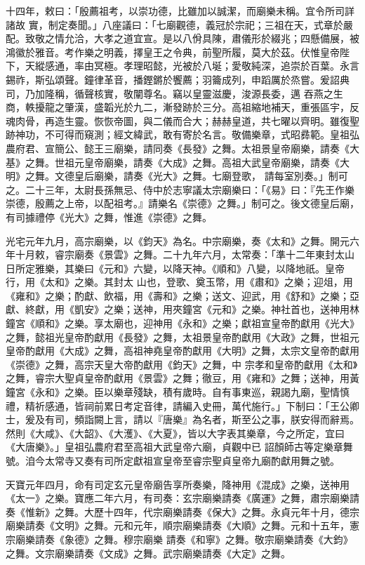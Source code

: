 \begin{pinyinscope}
 十四年，敕曰：「殷薦祖考，以崇功德，比雖加以誠潔，而廟樂未稱。宜令所司詳諸故
 實，制定奏聞。」八座議曰：「七廟觀德，義冠於宗祀；三祖在天，式章於嚴配。致敬之情允洽，大孝之道宜宣。是以八佾具陳，肅儀形於綴兆；四懸備展，被鴻徽於雅音。考作樂之明義，擇皇王之令典，前聖所履，莫大於茲。伏惟皇帝陛下，天縱感通，率由冥極。孝理昭懿，光被於八埏；愛敬純深，追崇於百葉。永言錫祚，斯弘頌聲。鐘律革音，播鏗鏘於饗薦；羽籥成列，申蹈厲於烝嘗。爰詔典司，乃加隆稱，循聲核實，敬闡尊名。竊以皇靈滋慶，浚源長委，邁
 吞燕之生商，軼擾龍之肇漢，盛韜光於九二，漸發跡於三分。高祖縮地補天，重張區宇，反魂肉骨，再造生靈。恢恢帝圖，與二儀而合大；赫赫皇道，共七曜以齊明。雖復聖跡神功，不可得而窺測；經文緯武，敢有寄於名言。敬備樂章，式昭彞範。皇祖弘農府君、宣簡公、懿王三廟樂，請同奏《長發》之舞。太祖景皇帝廟樂，請奏《大基》之舞。世祖元皇帝廟樂，請奏《大成》之舞。高祖大武皇帝廟樂，請奏《大明》之舞。文德皇后廟樂，請奏《光大》之舞。七廟登歌，
 請每室別奏。」制可之。二十三年，太尉長孫無忌、侍中於志寧議太宗廟樂曰：「《易》曰：『先王作樂崇德，殷薦之上帝，以配祖考。』請樂名《崇德》之舞。」制可之。後文德皇后廟，有司據禮停《光大》之舞，惟進《崇德》之舞。



 光宅元年九月，高宗廟樂，以《鈞天》為名。中宗廟樂，奏《太和》之舞。開元六年十月敕，睿宗廟奏《景雲》之舞。二十九年六月，太常奏：「準十二年東封太山日所定雅樂，其樂曰《元和》六變，以降天神。《順和》八變，以降地祇。皇帝行，用《太和》之樂。其封太
 山也，登歌、奠玉幣，用《肅和》之樂；迎俎，用《雍和》之樂；酌獻、飲福，用《壽和》之樂；送文、迎武，用《舒和》之樂；亞獻、終獻，用《凱安》之樂；送神，用夾鐘宮《元和》之樂。神社首也，送神用林鐘宮《順和》之樂。享太廟也，迎神用《永和》之樂；獻祖宣皇帝酌獻用《光大》之舞，懿祖光皇帝酌獻用《長發》之舞，太祖景皇帝酌獻用《大政》之舞，世祖元皇帝酌獻用《大成》之舞，高祖神堯皇帝酌獻用《大明》之舞，太宗文皇帝酌獻用《崇德》之舞，高宗天皇大帝酌獻用《鈞天》之舞，中
 宗孝和皇帝酌獻用《太和》之舞，睿宗大聖貞皇帝酌獻用《景雲》之舞；徹豆，用《雍和》之舞；送神，用黃鐘宮《永和》之樂。臣以樂章殘缺，積有歲時。自有事東巡，親謁九廟，聖情慎禮，精祈感通，皆祠前累日考定音律，請編入史冊，萬代施行。」下制曰：「王公卿士，爰及有司，頻詣闕上言，請以『唐樂』為名者，斯至公之事，朕安得而辭焉。然則《大咸》、《大韶》、《大濩》、《大夏》，皆以大字表其樂章，今之所定，宜曰《大唐樂》。」皇祖弘農府君至高祖大武皇帝六廟，貞觀中已
 詔顏師古等定樂章舞號。洎今太常寺又奏有司所定獻祖宣皇帝至睿宗聖貞皇帝九廟酌獻用舞之號。



 天寶元年四月，命有司定玄元皇帝廟告享所奏樂，降神用《混成》之樂，送神用《太一》之樂。寶應二年六月，有司奏：玄宗廟樂請奏《廣運》之舞，肅宗廟樂請奏《惟新》之舞。大歷十四年，代宗廟樂請奏《保大》之舞。永貞元年十月，德宗廟樂請奏《文明》之舞。元和元年，順宗廟樂請奏《大順》之舞。元和十五年，憲宗廟樂請奏《象德》之舞。穆宗廟樂
 請奏《和寧》之舞。敬宗廟樂請奏《大鈞》之舞。文宗廟樂請奏《文成》之舞。武宗廟樂請奏《大定》之舞。




\end{pinyinscope}
